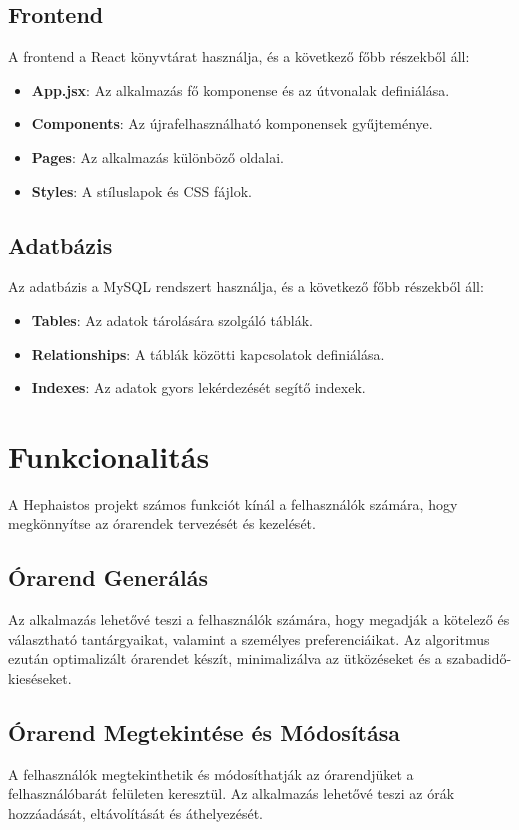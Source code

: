 \documentclass{article}
\begin{document}
\subsection{Frontend}
A frontend a React könyvtárat használja, és a következő főbb részekből áll:
\begin{itemize}
    \item \textbf{App.jsx}: Az alkalmazás fő komponense és az útvonalak definiálása.
    \item \textbf{Components}: Az újrafelhasználható komponensek gyűjteménye.
    \item \textbf{Pages}: Az alkalmazás különböző oldalai.
    \item \textbf{Styles}: A stíluslapok és CSS fájlok.
\end{itemize}

\subsection{Adatbázis}
Az adatbázis a MySQL rendszert használja, és a következő főbb részekből áll:
\begin{itemize}
    \item \textbf{Tables}: Az adatok tárolására szolgáló táblák.
    \item \textbf{Relationships}: A táblák közötti kapcsolatok definiálása.
    \item \textbf{Indexes}: Az adatok gyors lekérdezését segítő indexek.
\end{itemize}

\section{Funkcionalitás}
A Hephaistos projekt számos funkciót kínál a felhasználók számára, hogy megkönnyítse az órarendek tervezését és kezelését.

\subsection{Órarend Generálás}
Az alkalmazás lehetővé teszi a felhasználók számára, hogy megadják a kötelező és választható tantárgyaikat, valamint a személyes preferenciáikat. Az algoritmus ezután optimalizált órarendet készít, minimalizálva az ütközéseket és a szabadidő-kieséseket.

\subsection{Órarend Megtekintése és Módosítása}
A felhasználók megtekinthetik és módosíthatják az órarendjüket a felhasználóbarát felületen keresztül. Az alkalmazás lehetővé teszi az órák hozzáadását, eltávolítását és áthelyezését.
\end{document}
